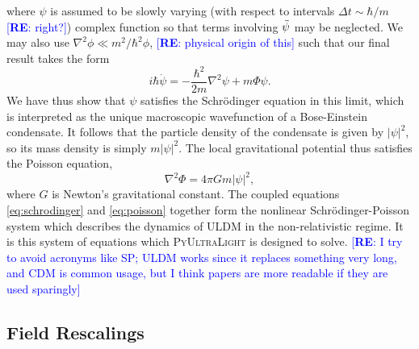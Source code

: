 \documentclass[a4paper,11pt]{article}
\newcommand{\PyUltraLight}{\textsc{PyUltraLight}\xspace}
\newcommand{\re}[1]{\textcolor{blue}{[{\bf RE}: #1]}}
\begin{document}
where $\psi$ is assumed to be slowly varying (with respect to intervals $\Delta t\sim \hbar/m$ \re{right?}) complex function so that terms involving $\Ddot{\psi}$ may be neglected. We may also use $\nabla^2\phi\ll m^2/\hbar^2\phi$, \re{physical origin of this} such that our final result takes the form
\begin{equation}\label{eq:schrodinger}
    i\hbar\Dot{\psi}=-\frac{\hbar^2}{2m}\nabla^2\psi+m\Phi\psi.
\end{equation}
We have thus show that $\psi$ satisfies the Schr{\"o}dinger equation in this limit, which is interpreted as the unique macroscopic wavefunction of a Bose-Einstein condensate. It follows that the particle density of the condensate is given by $\vert\psi\vert^2$, so its mass density is simply $m\vert\psi\vert^2$. The local gravitational potential thus satisfies the Poisson equation,
\begin{equation}\label{eq:poisson}
    \nabla^2\Phi=4\pi G m \vert\psi\vert^2,
\end{equation}
where $G$ is Newton's gravitational constant. The coupled equations \ref{eq:schrodinger} and \ref{eq:poisson} together form the nonlinear Schr{\"o}dinger-Poisson system which describes the dynamics of ULDM in the non-relativistic regime. It is this system of equations which \PyUltraLight is designed to solve. \re{I try to avoid acronyms like SP; ULDM works since it replaces something very long, and CDM is common usage, but I think papers are more readable if they are used sparingly}


\subsection{Field Rescalings}
\end{document}
